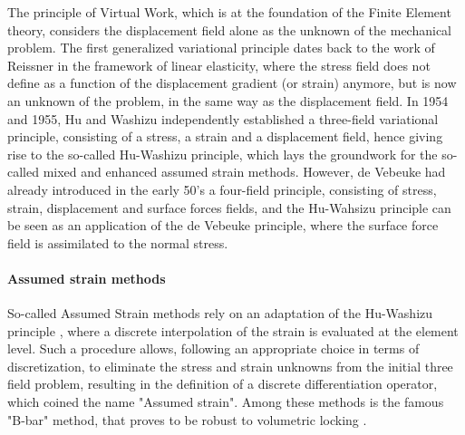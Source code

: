 The principle of Virtual Work, which is at the foundation of the Finite Element theory, considers the displacement field alone as the unknown of the mechanical problem.
The first generalized variational principle dates back to the work of Reissner \cite{reissner_variational_1950} in the framework of linear elasticity, where the stress field does
not define as a function of the displacement gradient (or strain) anymore, but is now an unknown of the problem, in the same way as the displacement field.
In 1954 and 1955, Hu \cite{hu_variational_1954} and Washizu \cite{washizu_variational_1955} independently established a three-field variational principle, consisting of a stress,
a strain and a displacement field, hence giving rise to the so-called Hu-Washizu principle, which lays the groundwork for the so-called mixed and enhanced assumed strain methods.
However, de Vebeuke \cite{fraeijs_de_veubeke_diffusion_1951} had already introduced in the early 50's a four-field principle, consisting of stress, strain, displacement and surface forces fields, and the Hu-Wahsizu principle
can be seen as an application of the de Vebeuke principle, where the surface force field is assimilated to the normal stress.

\paragraph{Assumed strain methods}

So-called Assumed Strain methods rely on an adaptation of the Hu-Washizu principle \cite{simo_variational_1985}, where a discrete interpolation of the strain is evaluated at the element level. Such a procedure allows,
following an appropriate choice in terms of discretization, to eliminate the stress and strain unknowns from the initial three field problem, resulting in the definition of a discrete differentiation operator,
which coined the name "Assumed strain". Among these methods is the famous "B-bar" method, that proves to be robust to volumetric locking
\cite{simo_variational_1985, hughes_finite_1981, simo_computational_1998, elguedj_b_2007}.


